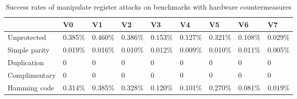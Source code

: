 \begin{table}
  \centering
  \caption{Success rates of manipulate register attacks on benchmarks with hardware countermeasures}
  \label{tab:manipulate}
\begin{tabular}{lllllllll}
\hline        
& V0 & V1 & V2 & V3 & V4 & V5 & V6 & V7 \\
\hline   
Unprotected                  & 0.385\%                                      & 0.460\%                                       & 0.386\%                                      & 0.153\%                                      & 0.127\%                                      & 0.321\%                                       & 0.108\%                                      & 0.029\%                                       \\
\hline
Simple parity             & 0.019\%                                      & 0.016\%                                       & 0.010\%                                      & 0.012\%                                      & 0.009\%                                      & 0.010\%                                       & 0.011\%                                      & 0.005\%                                        \\
\hline
Duplication               & 0                                              & 0                                              & 0                                              & 0                                              & 0                                              & 0                                              & 0                                              & 0                                              \\
\hline
Complimentary & 0                                              & 0                                              & 0                                              & 0                                              & 0                                              & 0                                              & 0                                              & 0                                              \\
\hline
Hamming code              & 0.314\%                                      & 0.385\%                                       & 0.328\%                                      & 0.120\%                                      & 0.101\%                                      & 0.270\%                                       & 0.081\%                                      & 0.019\%                                              \\

\end{tabular}
\end{table}
